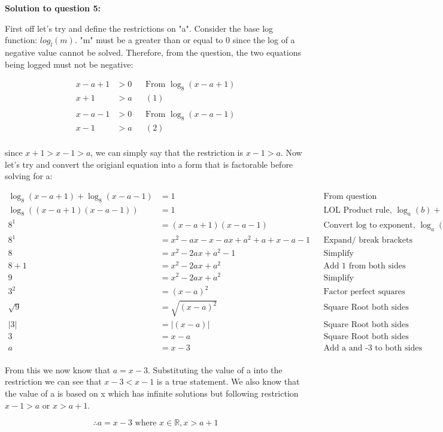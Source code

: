 \documentclass[12pt]{book}
\begin{document}
\begin{enumerate}
\vspace{0.1cm}
\textbf{Solution to question 5:}

First off let's try and define the restrictions on "a". Consider the base 
log function: $log_l(m)$. "m" must be a greater than or equal to 0 since the 
log of a negative value cannot be solved. Therefore, from the question, the two 
equations being logged must not be negative:

\begin{align*}
    x - a + 1 &> 0 && \text{From } \log_8(x-a+1) \\
    x + 1 &> a && (1)\\
\end{align*}
\vspace{-1cm}
\begin{align*}
    x - a - 1 &> 0 && \text{From } \log_8(x-a-1) \\
    x - 1 &> a && (2)\\
\end{align*}

since $x+1 > x-1 > a$, we can simply say that the restriction is $x-1 > a$. 
Now let's try and convert the origianl equation into a form that is factorable 
before solving for a:

\begin{align*}
    \log_8(x-a+1) + \log_8(x-a-1) &= 1 && \text{From question} \\
    \log_8((x-a+1)(x-a-1)) &= 1 && \text{LOL Product rule, } \log_a(b) + \log_a(c) = \log_a(bc) \\
    8^1 &= (x-a+1)(x-a-1) && \text{Convert log to exponent, } \log_a(b) = c \Longleftrightarrow a^c = b \\
    8^1 &= x^2-ax-x-ax+a^2+a+x-a-1 && \text{Expand/ break brackets} \\
    8 &= x^2-2ax+a^2-1 && \text{Simplify} \\
    8+1 &=  x^2-2ax+a^2 && \text{Add 1 from both sides} \\
    9 &=  x^2-2ax+a^2 && \text{Simplify} \\
    3^2 &=  (x-a)^2 && \text{Factor perfect squares} \\
    \sqrt{9} &= \sqrt{(x-a)^2} && \text{Square Root both sides} \\
    |3| &= |(x-a)| && \text{Square Root both sides} \\
    3 &= x-a && \text{Square Root both sides} \\
    a &= x-3 && \text{Add a and -3 to both sides} \\
\end{align*}

From this we now know that $a=x-3$. Substituting the value of a into the 
restriction we can see that $x-3<x-1$ is a true statement. We also know that 
the value of a is based on x which has infinite solutions but following 
restriction $x-1 > a$ or $x > a+1$.

$$\therefore a = x-3 \text{ where } x \in \mathbb{R}, x>a+1 $$

\newpage


\end{enumerate}
\end{document}
